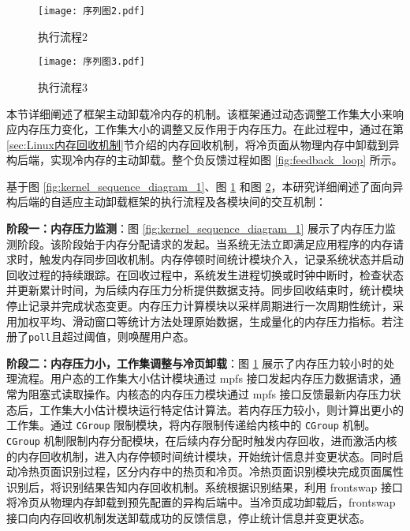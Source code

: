 \begin{figure}[h]
\centering
\texttt{[image: 序列图2.pdf]}
\caption{执行流程2}
\label{fig:kernel_sequence_diagram_2}
\end{figure}

\begin{figure}[h]
\centering
\texttt{[image: 序列图3.pdf]}
\caption{执行流程3}
\label{fig:kernel_sequence_diagram_3}
\end{figure}

本节详细阐述了框架主动卸载冷内存的机制。该框架通过动态调整工作集大小来响应内存压力变化，工作集大小的调整又反作用于内存压力。在此过程中，通过在第\ref{sec:Linux内存回收机制}节介绍的内存回收机制，将冷页面从物理内存中卸载到异构后端，实现冷内存的主动卸载。整个负反馈过程如图 \ref{fig:feedback_loop} 所示。

基于图 \ref{fig:kernel_sequence_diagram_1}、图 \ref{fig:kernel_sequence_diagram_2} 和图 \ref{fig:kernel_sequence_diagram_3}，本研究详细阐述了面向异构后端的自适应主动卸载框架的执行流程及各模块间的交互机制：

\textbf{阶段一：内存压力监测}：图 \ref{fig:kernel_sequence_diagram_1} 展示了内存压力监测阶段。该阶段始于内存分配请求的发起。当系统无法立即满足应用程序的内存请求时，触发内存同步回收机制。内存停顿时间统计模块介入，记录系统状态并启动回收过程的持续跟踪。在回收过程中，系统发生进程切换或时钟中断时，检查状态并更新累计时间，为后续内存压力分析提供数据支持。同步回收结束时，统计模块停止记录并完成状态变更。内存压力计算模块以采样周期进行一次周期性统计，采用加权平均、滑动窗口等统计方法处理原始数据，生成量化的内存压力指标。若注册了\texttt{poll}且超过阈值，则唤醒用户态。

\textbf{阶段二：内存压力小，工作集调整与冷页卸载}：图 \ref{fig:kernel_sequence_diagram_2} 展示了内存压力较小时的处理流程。用户态的工作集大小估计模块通过 mpfs 接口发起内存压力数据请求，通常为阻塞式读取操作。内核态的内存压力模块通过 mpfs 接口反馈最新内存压力状态后，工作集大小估计模块运行特定估计算法。若内存压力较小，则计算出更小的工作集。通过 \texttt{CGroup} 限制模块，将内存限制传递给内核中的 \texttt{CGroup} 机制。\texttt{CGroup} 机制限制内存分配模块，在后续内存分配时触发内存回收，进而激活内核的内存回收机制，进入内存停顿时间统计模块，开始统计信息并变更状态。同时启动冷热页面识别过程，区分内存中的热页和冷页。冷热页面识别模块完成页面属性识别后，将识别结果告知内存回收机制。系统根据识别结果，利用 frontswap 接口将冷页从物理内存卸载到预先配置的异构后端中。当冷页成功卸载后，frontswap 接口向内存回收机制发送卸载成功的反馈信息，停止统计信息并变更状态。

